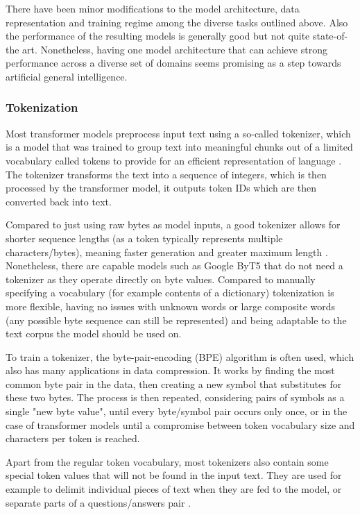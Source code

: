 There have been minor modifications to the model architecture, data representation and training regime among the diverse tasks outlined above. Also the performance of the resulting models is generally good but not quite state-of-the art. Nonetheless, having one model architecture that can achieve strong performance across a diverse set of domains seems promising as a step towards artificial general intelligence.


\subsubsection{Tokenization}

Most transformer models preprocess input text using a so-called tokenizer, which is a model that was trained to group text into meaningful chunks out of a limited vocabulary called tokens to provide for an efficient representation of language \cite{subwordunits}. The tokenizer transforms the text into a sequence of integers, which is then processed by the transformer model, it outputs token IDs which are then converted back into text.

Compared to just using raw bytes as model inputs, a good tokenizer allows for shorter sequence lengths (as a token typically represents multiple characters/bytes), meaning faster generation and greater maximum length \cite{tokenizerchoice}. Nonetheless, there are capable models such as Google ByT5 \cite{xue2022byt5} that do not need a tokenizer as they operate directly on byte values.
Compared to manually specifying a vocabulary (for example contents of a dictionary) tokenization is more flexible, having no issues with unknown words or large composite words (any possible byte sequence can still be represented) and being adaptable to the text corpus the model should be used on.

To train a tokenizer, the byte-pair-encoding (BPE) algorithm \cite{subwordunits} is often used, which also has many applications in data compression. It works by finding the most common byte pair in the data, then creating a new symbol that substitutes for these two bytes. The process is then repeated, considering pairs of symbols as a single "new byte value", until every byte/symbol pair occurs only once, or in the case of transformer models until a compromise between token vocabulary size and characters per token is reached.

Apart from the regular token vocabulary, most tokenizers also contain some special token values that will not be found in the input text. They are used for example to delimit individual pieces of text when they are fed to the model, or separate parts of a questions/answers pair \cite{HuggingFaceTokenizers}.


